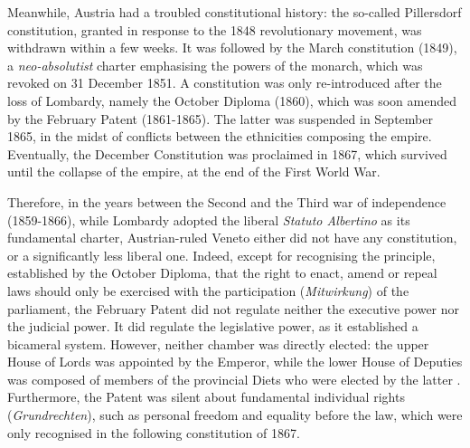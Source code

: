 Meanwhile, Austria had a troubled constitutional history: the so-called Pillersdorf constitution, granted in response to the 1848 revolutionary movement, was withdrawn within a few weeks. It was followed by the March constitution (1849), a \textit{neo-absolutist} charter emphasising the powers of the monarch, which was revoked on 31 December 1851. A constitution was only re-introduced after the loss of Lombardy, namely the October Diploma (1860), which was soon amended by the February Patent (1861-1865). The latter was suspended in September 1865, in the midst of conflicts between the ethnicities composing the empire. Eventually, the December Constitution was proclaimed in 1867, which survived until the collapse of the empire, at the end of the First World War.  

Therefore, in the years between the Second and the Third war of independence (1859-1866), while Lombardy adopted the liberal \textit{Statuto Albertino} as its fundamental charter, Austrian-ruled Veneto either did not have any constitution, or a significantly less liberal one. Indeed, except for recognising the principle, established by the October Diploma, that the right to enact, amend or repeal laws should only be exercised with the participation (\textit{Mitwirkung}) of the parliament, the February Patent did not regulate neither the executive power nor the judicial power. It did regulate the legislative power, as it established a bicameral system. However, neither chamber was directly elected: the upper House of Lords was appointed by the Emperor, while the lower House of Deputies was composed of members of the provincial Diets who were elected by the latter \citep[][pp. 582-583]{olechowski2010}. Furthermore, the Patent was silent about fundamental individual rights (\textit{Grundrechten}), such as personal freedom and equality before the law, which were only recognised in the following constitution of 1867.

